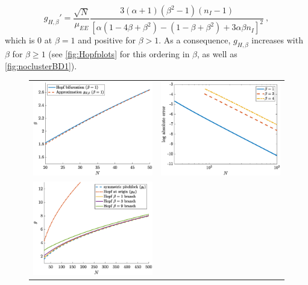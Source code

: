 \documentclass[reqno]{siamonline190516}
\begin{document}
\begin{equation}\label{eq:gprime}
g_{H,\beta}' = \frac{ \sqrt{N} }{ \mu_{EE} }
    \frac{ 
    3(\alpha+1)(\beta^2-1)(n_I-1)
    }
    { 
        \left[ \alpha(1 - 4 \beta + \beta^2) - (1 - \beta + \beta^2) + 3 \alpha \beta n_I \right]^2
    }\:,
\end{equation}
which is 0 at $\beta = 1$ and positive for $\beta > 1$. As a consequence, $g_{H,\beta}$ increases with $\beta$ for $\beta \geq 1$ (see \cref{fig:Hopfplots} for this ordering in $\beta$, as well as \cref{fig:noclusterBD1}). 

\begin{figure}
    \centering
    \begin{tabular}{cc}
    \includegraphics[width=7.8cm]{images/Hopfapproxbeta1.eps} &
    \includegraphics[width=7.8cm]{images/Hopfapproxerrorsemilog.eps} \\
    \includegraphics[width=7.8cm]{images/HopfNvsg.eps} &

\end{tabular}
\end{figure}
\end{document}
